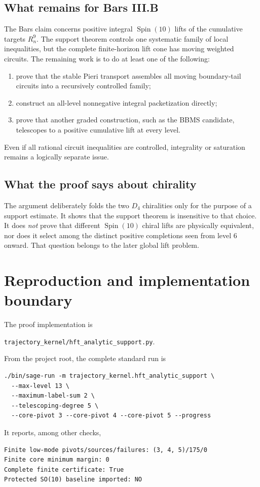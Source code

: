 \documentclass[11pt,a4paper]{article}
\theoremstyle{definition}
\newcommand{\Spin}{\operatorname{Spin}}
\begin{document}
\subsection{What remains for Bars III.B}

The Bars claim concerns positive integral $\Spin(10)$ lifts of the cumulative
targets $R_n^9$.  The support theorem controls one systematic family of local
inequalities, but the complete finite-horizon lift cone has moving weighted
circuits.  The remaining work is to do at least one of the following:
\begin{enumerate}
  \item prove that the stable Pieri transport assembles all moving
        boundary-tail circuits into a recursively controlled family;
  \item construct an all-level nonnegative integral packetization directly;
  \item prove that another graded construction, such as the BBMS candidate,
        telescopes to a positive cumulative lift at every level.
\end{enumerate}
Even if all rational circuit inequalities are controlled, integrality or
saturation remains a logically separate issue.

\subsection{What the proof says about chirality}

The argument deliberately folds the two $D_4$ chiralities only for the
purpose of a support estimate.  It shows that the support theorem is
insensitive to that choice.  It does \emph{not} prove that different
$\Spin(10)$ chiral lifts are physically equivalent, nor does it select among
the distinct positive completions seen from level 6 onward.  That question
belongs to the later global lift problem.

\section{Reproduction and implementation boundary}

The proof implementation is
\begin{center}
\texttt{trajectory\_kernel/hft\_analytic\_support.py}.
\end{center}
From the project root, the complete standard run is
\begin{verbatim}
./bin/sage-run -m trajectory_kernel.hft_analytic_support \
  --max-level 13 \
  --maximum-label-sum 2 \
  --telescoping-degree 5 \
  --core-pivot 3 --core-pivot 4 --core-pivot 5 --progress
\end{verbatim}
It reports, among other checks,
\begin{verbatim}
Finite low-mode pivots/sources/failures: (3, 4, 5)/175/0
Finite core minimum margin: 0
Complete finite certificate: True
Protected SO(10) baseline imported: NO
\end{verbatim}
\end{document}
